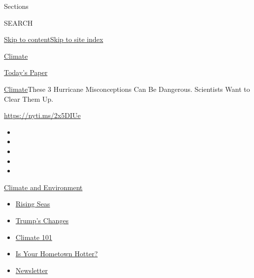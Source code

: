 Sections

SEARCH

\protect\hyperlink{site-content}{Skip to
content}\protect\hyperlink{site-index}{Skip to site index}

\href{https://www.nytimes.com/section/climate}{Climate}

\href{https://myaccount.nytimes.com/auth/login?response_type=cookie\&client_id=vi}{}

\href{https://www.nytimes.com/section/todayspaper}{Today's Paper}

\href{/section/climate}{Climate}\textbar{}These 3 Hurricane
Misconceptions Can Be Dangerous. Scientists Want to Clear Them Up.

\url{https://nyti.ms/2x5DIUe}

\begin{itemize}
\item
\item
\item
\item
\item
\end{itemize}

\href{https://www.nytimes.com/section/climate?action=click\&pgtype=Article\&state=default\&region=TOP_BANNER\&context=storylines_menu}{Climate
and Environment}

\begin{itemize}
\tightlist
\item
  \href{https://www.nytimes.com/2020/07/30/climate/sea-level-inland-floods.html?action=click\&pgtype=Article\&state=default\&region=TOP_BANNER\&context=storylines_menu}{Rising
  Seas}
\item
  \href{https://www.nytimes.com/interactive/2020/climate/trump-environment-rollbacks.html?action=click\&pgtype=Article\&state=default\&region=TOP_BANNER\&context=storylines_menu}{Trump's
  Changes}
\item
  \href{https://www.nytimes.com/interactive/2020/04/19/climate/climate-crash-course-1.html?action=click\&pgtype=Article\&state=default\&region=TOP_BANNER\&context=storylines_menu}{Climate
  101}
\item
  \href{https://www.nytimes.com/interactive/2018/08/30/climate/how-much-hotter-is-your-hometown.html?action=click\&pgtype=Article\&state=default\&region=TOP_BANNER\&context=storylines_menu}{Is
  Your Hometown Hotter?}
\item
  \href{https://www.nytimes.com/newsletters/climate-change?action=click\&pgtype=Article\&state=default\&region=TOP_BANNER\&context=storylines_menu}{Newsletter}
\end{itemize}

